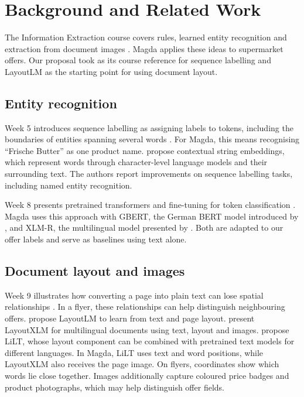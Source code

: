 \section{Background and Related Work}\label{sec:related}
The Information Extraction course covers rules, learned entity recognition and extraction from document images \citep[Weeks 3--9]{iecourse2026}. Magda applies these ideas to supermarket offers. Our proposal took \citet{akbik2018} as its course reference for sequence labelling and LayoutLM \citep{xu2020} as the starting point for using document layout.

\subsection{Entity recognition}
Week 5 introduces sequence labelling as assigning labels to tokens, including the boundaries of entities spanning several words \citep[pp.~7--8]{iecourse2026}. For Magda, this means recognising ``Frische Butter'' as one product name. \citet{akbik2018} propose contextual string embeddings, which represent words through character-level language models and their surrounding text. The authors report improvements on sequence labelling tasks, including named entity recognition.

Week 8 presents pretrained transformers and fine-tuning for token classification \citep[pp.~18--21]{iecourse2026}. Magda uses this approach with GBERT, the German BERT model introduced by \citet{chan2020}, and XLM-R, the multilingual model presented by \citet{conneau2020}. Both are adapted to our offer labels and serve as baselines using text alone.

\subsection{Document layout and images}\label{sec:layout-models}
Week 9 illustrates how converting a page into plain text can lose spatial relationships \citep[p.~7]{iecourse2026}. In a flyer, these relationships can help distinguish neighbouring offers. \citet{xu2020} propose LayoutLM to learn from text and page layout. \citet{xu2022xfund} present LayoutXLM for multilingual documents using text, layout and images. \citet{wang2022} propose LiLT, whose layout component can be combined with pretrained text models for different languages. In Magda, LiLT uses text and word positions, while LayoutXLM also receives the page image. On flyers, coordinates show which words lie close together. Images additionally capture coloured price badges and product photographs, which may help distinguish offer fields.

